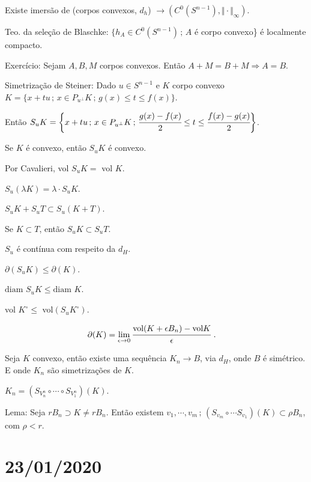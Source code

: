 \documentclass[12pt]{article}
\begin{document}
Existe imers\~ao de (corpos convexos, $d_h$) $\to (C^0(S^{n-1}), \Vert \cdot \Vert_\infty)$.

Teo. da sele\c{c}\~ao de Blaschke: $\{ h_A \in C^0(S^{n - 1})\,;\, A$ \'e corpo convexo\} \'e localmente compacto.

Exerc\'icio: Sejam $A, B, M$ corpos convexos. Ent\~ao $A + M = B + M \Rightarrow A = B$.

Simetriza\c{c}\~ao de Steiner: Dado $u\in S^{n - 1}$ e $K$ corpo convexo $K = \{ x + tu\,;\, x \in P_{u^\perp}K\,;\,g(x) \le t \le f(x)\}$.

Ent\~ao $S_u K = \bigg\{ x + tu\,;\,x \in P_{u^\perp} K\,;\,\cfrac{g(x) - f(x)}{2} \le t \le \cfrac{f(x) - g(x)}{2} \bigg\}$.

Se $K$ \'e convexo, ent\~ao $S_u K$ \'e convexo.

Por Cavalieri, vol $S_u K = $ vol $K$.

$S_u(\lambda K) = \lambda\cdot S_u K$.

$S_u K + S_u T \subset S_u (K + T)$.

Se $K \subset T$, ent\~ao $S_u K \subset S_u T$.

$S_u$ \'e cont\'inua com respeito da $d_H$.

$\partial (S_u K) \le \partial (K)$.

$\text{diam }S_u K \le \text{diam }K$.

vol $K^\circ \le $ vol$(S_u K^\circ)$.

\begin{align}
\partial(K) &= \lim_{\epsilon \to 0} \cfrac{\text{vol}(K + \epsilon B_n) - \text{vol} K}{\epsilon}\,\,.
\end{align}

Seja $K$ convexo, ent\~ao existe uma sequ\^encia $K_n \to B$, via $d_H$, onde $B$ \'e sim\'etrico. E onde $K_n$ s\~ao simetriza\c{c}\~oes de $K$.

$K_n = (S_{V_n^n} \circ \cdots \circ S_{V_1^n}) (K)$.

Lema: Seja $rB_n \supset K \ne rB_n$. Ent\~ao existem $v_1, \cdots, v_m\,;\,(S_{v_m} \circ \cdots S_{v_1}) (K) \subset \rho B_n$, com $\rho < r$.

\vspace{100mm}

\section{23/01/2020}

\begin{flushright}
\end{flushright}
\end{document}
